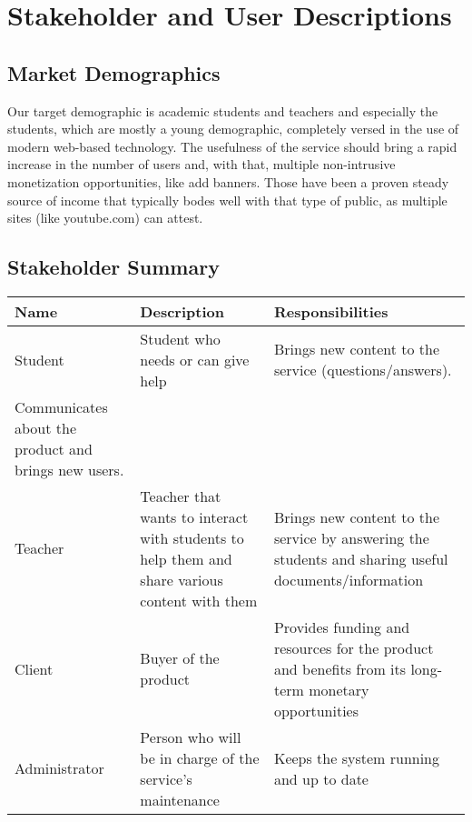 \documentclass [a4paper, 12pt] {article}
\begin{document}
\section{Stakeholder and User Descriptions}
\subsection{Market Demographics}
Our target demographic is academic students and teachers and especially the students, which are mostly a young demographic, completely versed in the use of modern web-based technology. The usefulness of the service should bring a rapid increase in the number of users and, with that, multiple non-intrusive monetization opportunities, like add banners. Those have been a proven steady source of income that typically bodes well with that type of public, as multiple sites (like youtube.com) can attest.

\subsection{Stakeholder Summary}
\begin{tabular}{| M{2.5cm} | M{5.5cm} | M{6cm} |}
	\hline
	Name & Description & Responsibilities \tabularnewline
	\hline \hline
	Student & Student who needs or can give help & Brings new content to the service (questions/answers). \\ Communicates about the product and brings new users.
\tabularnewline
	\hline
	Teacher & Teacher that wants to interact with students to help them and share various content with them & Brings new content to the service by answering the students and sharing useful documents/information \tabularnewline
	\hline
	Client & Buyer of the product & Provides funding and resources for the product and benefits from its long-term monetary opportunities \tabularnewline
	\hline
	Administrator & Person who will be in charge of the service's maintenance & Keeps the system running and up to date \tabularnewline
	\hline
\end{tabular}
\end{document}
